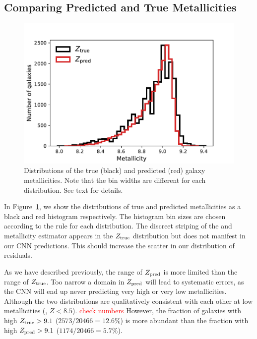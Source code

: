 \documentclass[fleqn,usenatbib]{mnras}
\newcommand{\editorial}[1]{\textcolor{red}{#1}}
\begin{document}
\subsection{Comparing Predicted and True Metallicities}
\begin{figure}
	\includegraphics[width=\columnwidth]{03-Z_distribution.pdf}
	\caption{\label{fig:distributions}
		Distributions of the true (black) and predicted (red) galaxy metallicities. Note that the bin widths are different for each distribution. See text for details.}
\end{figure}

In Figure~\ref{fig:distributions}, we show the distributions of true and predicted metallicities as a black and red histogram respectively. The histogram bin sizes are chosen according to the \cite{Freedman1981} rule for each distribution. The discreet striping of the \cite{Tremonti2004} and \cite{Brinchmann2004} metallicity estimator appears in the $Z_{\rm true}$ distribution but does not manifest in our CNN predictions. This should increase the scatter in our distribution of residuals.


As we have described previously, the range of $Z_{\rm pred}$ is more limited than the range of $Z_{\rm true}$. Too narrow a domain in $Z_{\rm pred}$ will lead to systematic errors, as the CNN will end up never predicting very high or very low metallicities. Although the two distributions are qualitatively consistent with each other at low metallicities (\eg, $Z < 8.5$). \editorial{check numbers} However, the fraction of galaxies with high $Z_{\rm true} > 9.1$ ($2573/20466 = 12.6\%$) is more abundant than the fraction with high $Z_{\rm pred} > 9.1$ ($1174/20466 = 5.7\%$).
\end{document}
